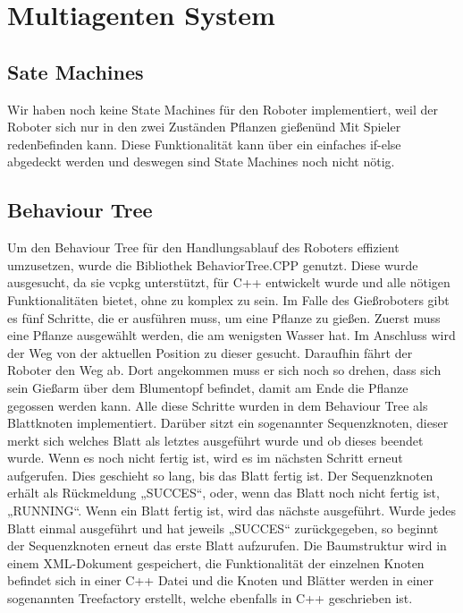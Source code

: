 \section{Multiagenten System}

\subsection{Sate Machines}

Wir haben noch keine State Machines für den Roboter implementiert, weil der Roboter sich nur in den zwei Zuständen \"Pflanzen gießen\" und \"Mit Spieler reden\" befinden kann. Diese Funktionalität kann über ein einfaches if-else abgedeckt werden und deswegen sind State Machines noch nicht nötig.

\subsection{Behaviour Tree}
Um den Behaviour Tree für den Handlungsablauf des Roboters effizient umzusetzen, wurde die Bibliothek BehaviorTree.CPP genutzt. Diese wurde ausgesucht, da sie vcpkg unterstützt, für C++ entwickelt wurde und alle nötigen Funktionalitäten bietet, ohne zu komplex zu sein. 
Im Falle des Gießroboters gibt es fünf Schritte, die er ausführen muss, um eine Pflanze zu gießen. Zuerst muss eine Pflanze ausgewählt werden, die am wenigsten Wasser hat. Im Anschluss wird der Weg von der aktuellen Position zu dieser gesucht. Daraufhin fährt der Roboter den Weg ab. Dort angekommen muss er sich noch so drehen, dass sich sein Gießarm über dem Blumentopf befindet, damit am Ende die Pflanze gegossen werden kann. Alle diese Schritte wurden in dem Behaviour Tree als Blattknoten implementiert. Darüber sitzt ein sogenannter Sequenzknoten, dieser merkt sich welches Blatt als letztes ausgeführt wurde und ob dieses beendet wurde. Wenn es noch nicht fertig ist, wird es im nächsten Schritt erneut aufgerufen. Dies geschieht so lang, bis das Blatt fertig ist. Der Sequenzknoten erhält als Rückmeldung „SUCCES“, oder, wenn das Blatt noch nicht fertig ist, „RUNNING“. Wenn ein Blatt fertig ist, wird das nächste ausgeführt. Wurde jedes Blatt einmal ausgeführt und hat jeweils „SUCCES“ zurückgegeben, so beginnt der Sequenzknoten erneut das erste Blatt aufzurufen. 
Die Baumstruktur wird in einem XML-Dokument gespeichert, die Funktionalität der einzelnen Knoten befindet sich in einer C++ Datei und die Knoten und Blätter werden in einer sogenannten Treefactory erstellt, welche ebenfalls in C++ geschrieben ist.
